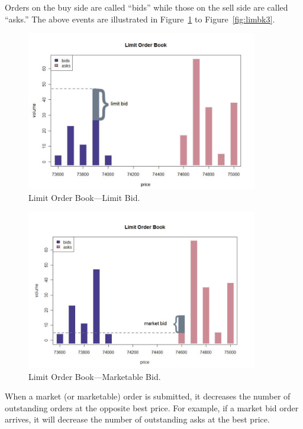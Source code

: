 Orders on the buy side are called ``bids'' while those on the sell side are called ``asks.'' The above events are illustrated in Figure~\ref{fig:limbk1} to Figure~\ref{fig:limbk3}. \\
	\begin{figure}[!ht]
	   \centering
	   \includegraphics[width=0.9\textwidth]{chapters/chapter_trading_fund/figures/limitbk1.png} 
	   \caption{Limit Order Book---Limit Bid. \label{fig:limbk1}}
	\end{figure}
	\begin{figure}[!ht]
	   \centering
	   \includegraphics[width=0.9\textwidth]{chapters/chapter_trading_fund/figures/limitbk2.png} 
	   \caption{Limit Order Book---Marketable Bid. \label{fig:limbk2}}
	\end{figure}
When a market (or marketable) order is submitted, it decreases the number of outstanding orders at the opposite best price. For example, if a market bid order arrives, it will decrease the number of outstanding asks at the best price.
